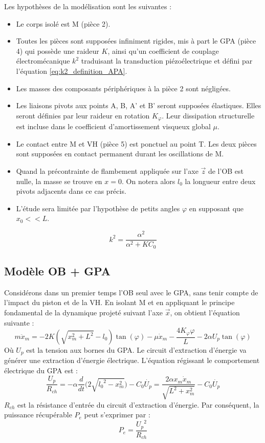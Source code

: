 Les hypothèses de la modélisation sont les suivantes :
\begin{itemize}[label=$\circ$]
	\item Le corps isolé est M (pièce 2).
	\item Toutes les pièces sont supposées infiniment rigides, mis à part le GPA (pièce 4) qui possède une raideur $K$, ainsi qu'un coefficient de couplage électromécanique $k^2$ traduisant la transduction piézoélectrique et défini par l'équation \ref{eq:k2_definition_APA}.
	\item Les masses des composants périphériques à la pièce 2 sont négligées.
	\item Les liaisons pivots aux points A, B, A' et B' seront supposées élastiques. Elles seront définies par leur raideur en rotation $K_{\varphi}$. Leur dissipation structurelle est incluse dans le coefficient d'amortissement visqueux global $\mu$.
	\item Le contact entre M et VH (pièce 5) est ponctuel au point T. Les deux pièces sont supposées en contact permanent durant les oscillations de M.
	\item Quand la précontrainte de flambement appliquée sur l'axe $\vec{z}$ de l'OB est nulle, la masse se trouve en $x=0$. On notera alors $l_0$ la longueur entre deux pivots adjacents dans ce cas précis.
	\item L'étude sera limitée par l'hypothèse de petits angles ${\varphi}$ en supposant que $x_0<<L$.
\end{itemize}
\begin{equation}
	k^2 = \dfrac{\alpha^2 }{\alpha^2 + KC_0}
	\label{eq:k2_definition_APA}
\end{equation}
	\subsection{Modèle OB + GPA}
	\label{2.3.1_Modèle OB + GPA}
Considérons dans un premier temps l'OB seul avec le GPA, sans tenir compte de l'impact du piston et de la VH. En isolant M et en appliquant le principe fondamental de la dynamique projeté suivant l'axe $\vec{x}$, on obtient l'équation suivante :
\begin{equation}
m \ddot{x}_m = - 2K(\sqrt{x_m^2+L^2}-l_0)\tan(\varphi) - \mu \dot{x}_m			
			 - \frac{4K_{\varphi}\varphi}{L}
			 - 2\alpha U_p \tan(\varphi)
\label{eq:OB-GPA}
\end{equation}
Où $U_p$ est la tension aux bornes du GPA. Le circuit d'extraction d'énergie va générer une extraction d'énergie électrique. L'équation régissant le comportement électrique du GPA est :
\begin{equation}
	\dfrac{U_p}{R_{ch}} = 
	-\alpha\dfrac{d}{dt}\biggl(2\sqrt{{l_0}^2-x_m^2}\biggr)
	- C_0\dot{U_p}
	= \frac{2\alpha x_m\dot{x}_m}{\sqrt{L^2+x_m^2}} - C_0\dot{U_p}
\end{equation}
$R_{ch}$ est la résistance d'entrée du circuit d'extraction d'énergie. Par conséquent, la puissance récupérable $P_{e}$ peut s'exprimer par :
\begin{equation}
P_e = \frac{{U_p}^2}{R_{ch}} 
\label{eq:P_e}
\end{equation} 

